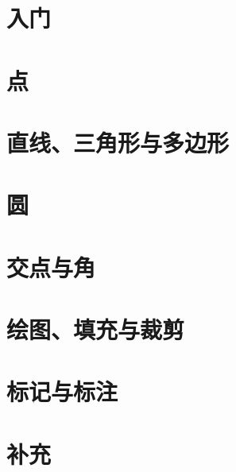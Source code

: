 \documentclass[DIV         = 14,
               fontsize    = 10,
               index       = totoc,
               twoside,
               cadre,
               headings    = small,
               ]{tkz-doc-euclide}
\begin{document}
\clearpage
\setcounter{tocdepth}{2}%
\tableofcontents
\clearpage
\newpage

\part{入门}





\part{点}






\part{直线、三角形与多边形}




\part{圆}



\part{交点与角}



\part{绘图、填充与裁剪}




\part{标记与标注}



\part{补充}




\end{document}
